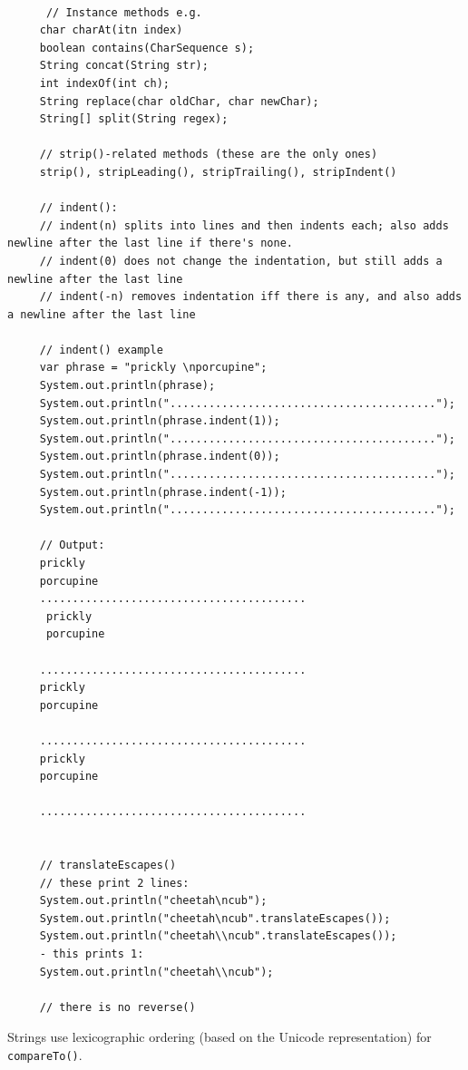 \documentclass{scrartcl}
\begin{document}
    \begin{lstlisting}

      // Instance methods e.g.
     char charAt(itn index)
     boolean contains(CharSequence s);
     String concat(String str);
     int indexOf(int ch);
     String replace(char oldChar, char newChar);
     String[] split(String regex);

     // strip()-related methods (these are the only ones)
     strip(), stripLeading(), stripTrailing(), stripIndent()

     // indent():
     // indent(n) splits into lines and then indents each; also adds newline after the last line if there's none.
     // indent(0) does not change the indentation, but still adds a newline after the last line
     // indent(-n) removes indentation iff there is any, and also adds a newline after the last line

     // indent() example
     var phrase = "prickly \nporcupine";
     System.out.println(phrase);
     System.out.println(".........................................");
     System.out.println(phrase.indent(1));
     System.out.println(".........................................");
     System.out.println(phrase.indent(0));
     System.out.println(".........................................");
     System.out.println(phrase.indent(-1));
     System.out.println(".........................................");

     // Output:
     prickly
     porcupine
     .........................................
      prickly
      porcupine

     .........................................
     prickly
     porcupine

     .........................................
     prickly
     porcupine

     .........................................


     // translateEscapes()
     // these print 2 lines:
     System.out.println("cheetah\ncub");
     System.out.println("cheetah\ncub".translateEscapes());
     System.out.println("cheetah\\ncub".translateEscapes());
     - this prints 1:
     System.out.println("cheetah\\ncub");

     // there is no reverse()
     \end{lstlisting}

     Strings use lexicographic ordering (based on the Unicode representation) for \lstinline|compareTo()|.
\end{document}
